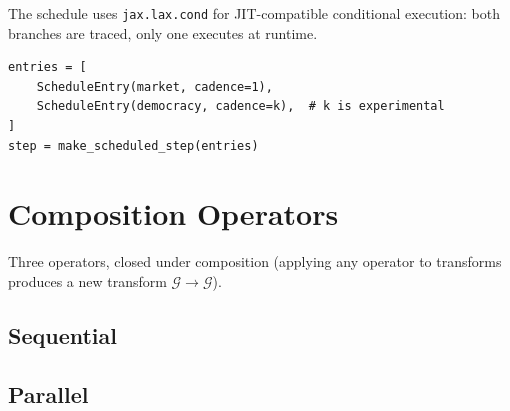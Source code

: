 \documentclass[11pt]{article}
\begin{document}
\noindent The schedule uses \texttt{jax.lax.cond} for JIT-compatible conditional execution:
both branches are traced, only one executes at runtime.

\begin{lstlisting}
entries = [
    ScheduleEntry(market, cadence=1),
    ScheduleEntry(democracy, cadence=k),  # k is experimental
]
step = make_scheduled_step(entries)
\end{lstlisting}

\section{Composition Operators}

Three operators, closed under composition (applying any operator to transforms
produces a new transform $\mathcal{G} \to \mathcal{G}$).

\subsection{Sequential}

\begin{center}
\end{center}

\subsection{Parallel}
\end{document}
